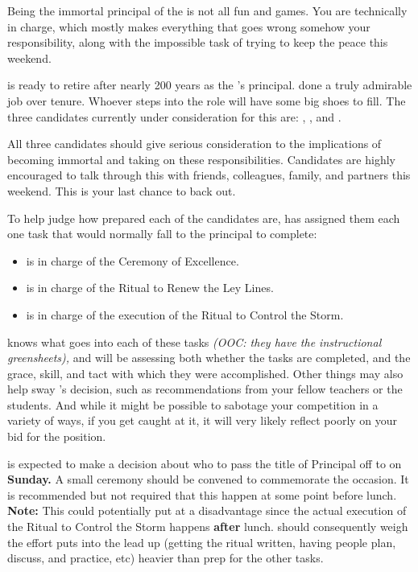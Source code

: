 \documentclass[green]{GL2020}
\begin{document}
\name{\gNewPrincipal{}}

Being the immortal principal of the \pSchool{} is not all fun and games. You are technically in charge, which mostly makes everything that goes wrong somehow your responsibility, along with the impossible task of trying to keep the peace this weekend.

\cPrincipal{\full} is ready to retire after nearly 200 years as the \pSc{}’s principal. \cPrincipal{\They} \cPrincipal{\have} done a truly admirable job over \cPrincipal{\their} tenure. Whoever steps into the role will have some big shoes to fill. The three candidates currently under consideration for this are: \cMusic{\full}, \cBeetle{\full}, and \cChupSecond{\full}. 

All three candidates should give serious consideration to the implications of becoming immortal and taking on these responsibilities. Candidates are highly encouraged to talk through this with friends, colleagues, family, and partners this weekend. This is your last chance to back out.

To help judge how prepared each of the candidates are, \cPrincipal{} has assigned them each one task that would normally fall to the principal to complete:
\begin{itemize}
  \item \cMusic{} is in charge of the Ceremony of Excellence.
  \item \cBeetle{} is in charge of the Ritual to Renew the Ley Lines.
  \item \cChupSecond{} is in charge of the execution of the Ritual to Control the Storm.
\end{itemize}

\cPrincipal{} knows what goes into each of these tasks \emph{(OOC: they have the instructional greensheets),} and will be assessing both whether the tasks are completed, and the grace, skill, and tact with which they were accomplished. Other things may also help sway \cPrincipal{}’s decision, such as recommendations from your fellow teachers or the students. And while it might be possible to sabotage your competition in a variety of ways, if you get caught at it, it will very likely reflect poorly on your bid for the position.

\cPrincipal{} is expected to make a decision about who to pass the title of Principal off to on \textbf{Sunday.} A small ceremony should be convened to commemorate the occasion. It is recommended but not required that this happen at some point before lunch. \textbf{Note:} This could potentially put \cChupSecond{} at a disadvantage since the actual execution of the Ritual to Control the Storm happens \textbf{after} lunch. \cPrincipal{} should consequently weigh the effort \cChupSecond{} puts into the lead up (getting the ritual written, having people plan, discuss, and practice, etc) heavier than prep for the other tasks. 
\end{document}
